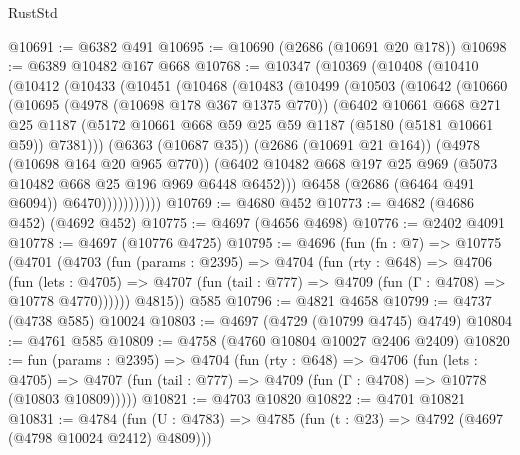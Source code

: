 \begin{lexlean}{RustStd}
\begin{coremodule}
@10691 := @6382 @491
@10695 := @10690 (@2686 (@10691 @20 @178))
@10698 := @6389 @10482 @167 @668
@10768 := @10347
    (@10369
      (@10408
        (@10410
          (@10412
            (@10433
              (@10451
                (@10468
                  (@10483
                    (@10499
                      (@10503
                        (@10642
                          (@10660
                            (@10695
                              (@4978 (@10698 @178 @367 @1375 @770))
                              (@6402
                                @10661
                                @668
                                @271
                                @25
                                @1187
                                (@5172
                                  @10661
                                  @668
                                  @59
                                  @25
                                  @59
                                  @1187
                                  (@5180 (@5181 @10661 @59))
                                  @7381)))
                            (@6363 (@10687 @35))
                            (@2686 (@10691 @21 @164))
                            (@4978 (@10698 @164 @20 @965 @770))
                            (@6402
                              @10482
                              @668
                              @197
                              @25
                              @969
                              (@5073 @10482 @668 @25 @196 @969 @6448 @6452)))
                          @6458
                          (@2686 (@6464 @491 @6094))
                          @6470)))))))))))
@10769 := @4680 @452
@10773 := @4682 (@4686 @452) (@4692 @452)
@10775 := @4697 (@4656 @4698)
@10776 := @2402 @4091
@10778 := @4697 (@10776 @4725)
@10795 := @4696
    (fun (fn : @7) =>
    @10775
      (@4701
        (@4703
          (fun (params : @2395) =>
          @4704
            (fun (rty : @648) =>
            @4706
              (fun (lets : @4705) =>
              @4707 (fun (tail : @777) => @4709 (fun (Γ : @4708) => @10778 @4770))))))
        @4815))
    @585
@10796 := @4821 @4658
@10799 := @4737 (@4738 @585) @10024
@10803 := @4697 (@4729 (@10799 @4745) @4749)
@10804 := @4761 @585
@10809 := @4758 (@4760 @10804 @10027 @2406 @2409)
@10820 := fun (params : @2395) =>
  @4704
    (fun (rty : @648) =>
    @4706
      (fun (lets : @4705) =>
      @4707 (fun (tail : @777) => @4709 (fun (Γ : @4708) => @10778 (@10803 @10809)))))
@10821 := @4703 @10820
@10822 := @4701 @10821
@10831 := @4784
    (fun (U : @4783) => @4785 (fun (t : @23) => @4792 (@4697 (@4798 @10024 @2412) @4809)))

\end{coremodule}
\end{lexlean}
